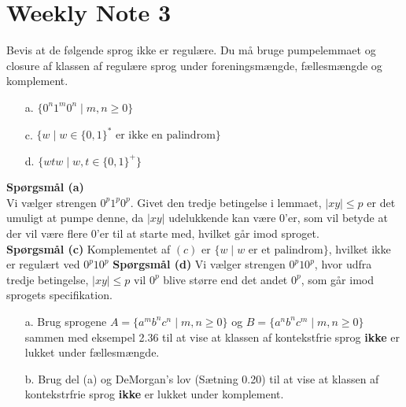 \chapter{Weekly Note 3}

\begin{exercise}[Sipser 1.46 (a) (c) (d)]
  Bevis at de følgende sprog ikke er regulære. Du må bruge pumpelemmaet og closure af klassen af regulære sprog under foreningsmængde, fællesmængde og komplement.

  \begin{enumerate}
    \item[a.] $\{0^{n}1^{m}0^{n} \mid m,n \ge 0\}$
    \item[c.] $\{w \mid w \in \{0,1\}^{*} \text{ er ikke en palindrom}\}$
    \item[d.] $\{wtw \mid w, t \in \{0,1\}^{+}\}$
  \end{enumerate}
\end{exercise}

\noindent
\textbf{Spørgsmål (a)}\\
\noindent
Vi vælger strengen $0^{p}1^{p}0^{p}$. Givet den tredje betingelse i lemmaet, $|xy| \le p$ er det umuligt at pumpe denne, da $|xy|$ udelukkende kan være $0$'er, som vil betyde at der vil være flere 0'er til at starte med, hvilket går imod sproget.\\
\noindent
\textbf{Spørgsmål (c)}
\noindent
Komplementet af $(c)$ er $\{w \mid w \text{ er et palindrom}\}$, hvilket ikke er regulært ved $0^{p}10^{p}$
\noindent
\textbf{Spørgsmål (d)}
\noindent
Vi vælger strengen $0^{p}10^{p}$, hvor udfra tredje betingelse, $|xy| \le p$ vil $0^{p}$ blive større end det andet $0^{p}$, som går imod sprogets specifikation.

\begin{exercise}[Sipser 2.2]
  \begin{enumerate}
    \item[a.] Brug sprogene $A = \{a^{m}b^{n}c^{n} \mid m,n \ge 0\}$ og $B = \{a^{n}b^{n}c^{m} \mid m,n \ge 0\}$ sammen med eksempel 2.36 til at vise at klassen af kontekstfrie sprog \textbf{ikke} er lukket under fællesmængde.
    \item[b.] Brug del (a) og DeMorgan's lov (Sætning 0.20) til at vise at klassen af kontekstrfrie sprog \textbf{ikke} er lukket under komplement.
  \end{enumerate}

\end{exercise}


